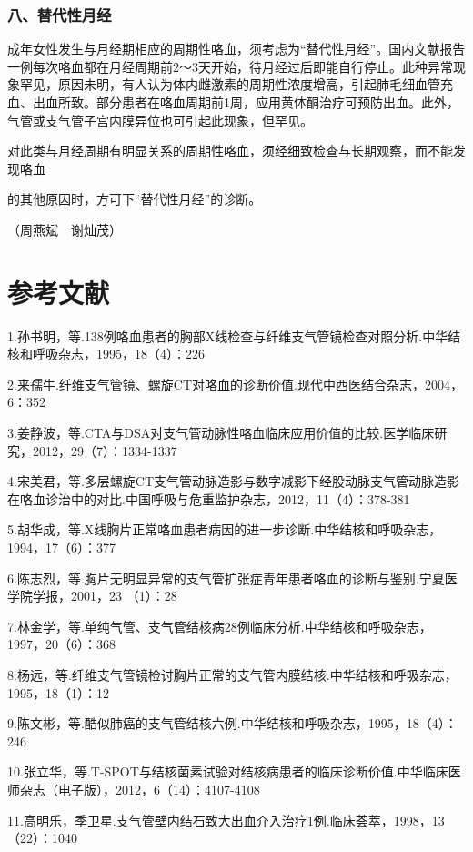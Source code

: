 \subsubsection{八、替代性月经}

成年女性发生与月经期相应的周期性咯血，须考虑为“替代性月经”。国内文献报告一例每次咯血都在月经周期前2～3天开始，待月经过后即能自行停止。此种异常现象罕见，原因未明，有人认为体内雌激素的周期性浓度增高，引起肺毛细血管充血、出血所致。部分患者在咯血周期前1周，应用黄体酮治疗可预防出血。此外，气管或支气管子宫内膜异位也可引起此现象，但罕见。

对此类与月经周期有明显关系的周期性咯血，须经细致检查与长期观察，而不能发现咯血

的其他原因时，方可下“替代性月经”的诊断。

（周燕斌　谢灿茂）

\protect\hypertarget{text00061.html}{}{}

\section{参考文献}

1.孙书明，等.138例咯血患者的胸部X线检查与纤维支气管镜检查对照分析.中华结核和呼吸杂志，1995，18（4）：226

2.来孺牛.纤维支气管镜、螺旋CT对咯血的诊断价值.现代中西医结合杂志，2004，6：352

3.姜静波，等.CTA与DSA对支气管动脉性咯血临床应用价值的比较.医学临床研究，2012，29（7）：1334-1337

4.宋美君，等.多层螺旋CT支气管动脉造影与数字减影下经股动脉支气管动脉造影在咯血诊治中的对比.中国呼吸与危重监护杂志，2012，11（4）：378-381

5.胡华成，等.X线胸片正常咯血患者病因的进一步诊断.中华结核和呼吸杂志，1994，17（6）：377

6.陈志烈，等.胸片无明显异常的支气管扩张症青年患者咯血的诊断与鉴别.宁夏医学院学报，2001，23
（1）：28

7.林金学，等.单纯气管、支气管结核病28例临床分析.中华结核和呼吸杂志，1997，20（6）：368

8.杨远，等.纤维支气管镜检讨胸片正常的支气管内膜结核.中华结核和呼吸杂志，1995，18（1）：12

9.陈文彬，等.酷似肺癌的支气管结核六例.中华结核和呼吸杂志，1995，18（4）：246

10.张立华，等.T-SPOT与结核菌素试验对结核病患者的临床诊断价值.中华临床医师杂志（电子版），2012，6（14）：4107-4108

11.高明乐，季卫星.支气管壁内结石致大出血介入治疗1例.临床荟萃，1998，13（22）：1040

